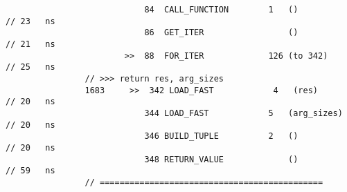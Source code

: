 \begin{code}
\begin{verbatim}
                            84  CALL_FUNCTION        1   ()                                 // 23   ns
                            86  GET_ITER                 ()                                 // 21   ns
                        >>  88  FOR_ITER             126 (to 342)                           // 25   ns
                // >>> return res, arg_sizes
                1683     >>  342 LOAD_FAST            4   (res)                             // 20   ns
                            344 LOAD_FAST            5   (arg_sizes)                        // 20   ns
                            346 BUILD_TUPLE          2   ()                                 // 20   ns
                            348 RETURN_VALUE             ()                                 // 59   ns
                // =============================================


\end{verbatim}
\end{code}
